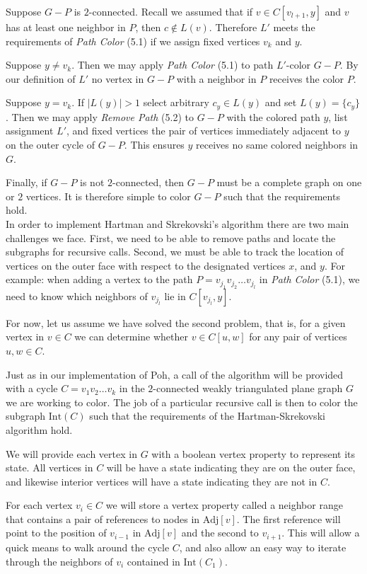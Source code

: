 \documentclass[letterpaper, 12pt]{amsart}
\theoremstyle{definition}
\theoremstyle{definition}
\theoremstyle{thm}
\theoremstyle{definition}
\begin{document}
Suppose $G-P$ is $2$-connected. Recall we assumed that if $v\in C[v_{l+1},y]$
and $v$ has at least one neighbor in $P$, then $c\not\in L(v)$. Therefore $L'$
meets the requirements of \textit{Path Color} (5.1) if we assign fixed vertices
$v_k$ and $y$.

Suppose $y\ne v_k$. Then we may apply \textit{Path Color} (5.1) to
path $L'$-color $G-P$. By our definition of $L'$ no vertex in $G-P$ with a
neighbor in $P$ receives the color $P$.

Suppose $y=v_k$. If $|L(y)|>1$ select arbitrary $c_y\in L(y)$ and set
$L(y)=\{c_y\}$. Then we may apply \textit{Remove Path} (5.2) to $G-P$ with the
colored path $y$, list assignment $L'$, and fixed vertices the pair of
vertices immediately adjacent to $y$ on the outer cycle of $G-P$. This ensures
$y$ receives no same colored neighbors in $G$.

Finally, if $G-P$ is not $2$-connected, then $G-P$ must be a complete
graph on one or $2$ vertices. It is therefore simple to color $G-P$ such that
the requirements hold.\\

In order to implement Hartman and Skrekovski's algorithm there are two main
challenges we face. First, we need to be able to remove paths and locate the
subgraphs for recursive calls. Second, we must be able to track the
location of vertices on the outer face with respect to the designated vertices
$x$, and $y$. For example: when adding a vertex to the path
$P=v_{j_1}v_{j_2}\ldots v_{j_l}$ in \textit{Path Color} (5.1), we need to know
which neighbors of $v_{j_l}$ lie in $C[v_{j_l},y]$.

For now, let us assume we have solved the second problem, that is, for a given
vertex in $v\in C$ we can determine whether $v\in C[u,w]$ for any pair of
vertices $u,w\in C$.

Just as in our implementation of Poh, a call of the algorithm will be provided
with a cycle $C=v_1v_2\ldots v_k$ in the $2$-connected weakly triangulated
plane graph $G$ we are working to color. The job of a particular recursive call
is then to color the subgraph $\text{Int}(C)$ such that the requirements of the
Hartman-Skrekovski algorithm hold.

We will provide each vertex in $G$ with a boolean vertex
property to represent its state. All vertices in $C$ will be have a state indicating
they are on the outer face, and likewise interior vertices will have a state
indicating they are not in $C$.

For each vertex $v_i\in C$ we will store a
vertex property called a neighbor range that contains a pair of references to
nodes in $\text{Adj}[v]$. The first reference will point to the position of
$v_{i-1}$ in $\text{Adj}[v]$ and the second to $v_{i+1}$. This will allow a quick
means to walk around the cycle $C$, and also allow an easy way to iterate
through the neighbors of $v_i$ contained in $\text{Int}(C_1)$.
\end{document}
